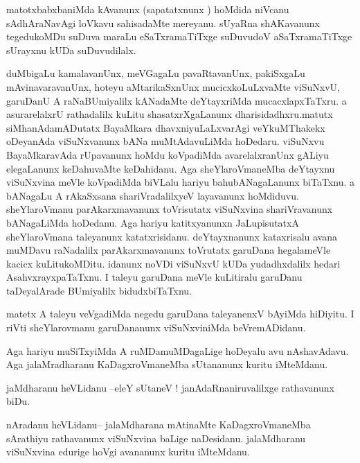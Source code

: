\documentclass{article}
\begin{document}
\begin{mn}%
matotxbabxbaniMda kAvanunx (sapatatxnunx ) hoMdida niVcanu sAdhAraNavAgi loVkavu sahisadaMte 
mereyanu. sUyaRna shAKavanunx tegedukoMDu suDuva maraLu eSaTxramaTiTxge suDuvudoV 
aSaTxramaTiTxge sUrayxnu kUDa suDuvudilalx.
\end{mn}

\begin{mn}%
duMbigaLu kamalavanUnx, meVGagaLu pavaRtavanUnx, pakiSxgaLu mAvinavaravanUnx, hoteyu 
aMtarikaSxnUnx mucicxkoLuLxvaMte viSuNxvU, garuDanU A raNaBUmiyalilx kANadaMte deYtayxriMda 
mucacxlapxTaTxru. a asurarelalxrU rathadalilx kuLitu shasatxrXgaLanunx 
dharisidadhxru.matutx siMhanAdamADutatx BayaMkara dhavxniyuLaLxvarAgi veYkuMThakekx 
oDeyanAda viSuNxvanunx bANa muMtAdavuLiMda hoDedaru. viSuNxvu BayaMkaravAda rUpavanunx 
hoMdu koVpadiMda avarelalxranUnx gALiyu elegaLanunx keDahuvaMte keDahidanu. Aga 
sheYlaroVmaneMba deYtayxnu viSuNxvina meVle koVpadiMda biVLalu hariyu bahubANagaLanunx 
biTaTxnu. a bANagaLu A rAkaSxsana shariVradalilxyeV layavanunx hoMdiduvu. sheYlaroVmanu 
parAkarxmavanunx toVrisutatx viSuNxvina shariVravanunx bANagaLiMda hoDedanu. Aga hariyu 
katitxyanunxn JaLupisutatxA sheYlaroVmana taleyanunx katatxrisidanu. deYtayxnanunx 
kataxrisalu avana muMDavu raNadalilx parAkarxmavanunx toVrutatx garuDana hegalameVle kacicx 
kuLitukoMDitu. idanunx noVDi viSuNxvU kUDa yudadhxdalilx hedari AsahvxrayxpaTaTxnu. I  
taleyu garuDana meVle kuLitiralu garuDanu taDeyalArade BUmiyalilx bidudxbiTaTxnu.
\end{mn}

\begin{mn}%
matetx A taleyu veVgadiMda negedu garuDana taleyanenxV bAyiMda hiDiyitu. I riVti 
sheYlarovmanu garuDananunx viSuNxviniMda beVremADidanu.
\end{mn}

\begin{mn}%
Aga hariyu muSiTxyiMda A ruMDamuMDagaLige hoDeyalu avu nAshavAdavu. Aga jalaMradharanu 
KaDagxroVmaneMba sUtananunx kuritu iMteMdanu.
\end{mn}

\begin{mn}%
jaMdharanu heVLidanu --eleY sUtaneV ! janAdaRnaniruvalilxge rathavanunx biDu.
\end{mn}

\begin{mn}%
nAradanu heVLidanu-- jalaMdharana mAtinaMte KaDagxroVmaneMba sArathiyu rathavanunx 
viSuNxvina baLige naDesidanu. jalaMdharanu viSuNxvina edurige hoVgi avananunx kuritu 
iMteMdanu.
\end{mn}
\end{document}
